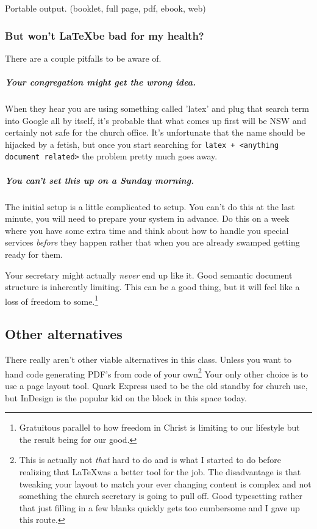 \documentclass[12pt]{scrartcl}
\begin{document}
Portable output. (booklet, full page, pdf, ebook, web)

\subsubsection{But won't \LaTeX be bad for my health?}

There are a couple pitfalls to be aware of.


\subparagraph{Your congregation might get the wrong idea.}

When they hear you are using something called 'latex' and plug that search term into Google all by itself, it's probable that what comes up first will be NSW and certainly not safe for the church office. It's unfortunate that the name should be hijacked by a fetish, but once you start searching for \texttt{latex + <anything document related>} the problem pretty much goes away.


\subparagraph{You can't set this up on a Sunday morning.}

The initial setup is a little complicated to setup. You can't do this at the last minute, you will need to prepare your system in advance. Do this on a week where you have some extra time and think about how to handle you special services \emph{before} they happen rather that when you are already swamped getting ready for them.

Your secretary might actually \emph{never} end up like it. Good semantic document structure is inherently limiting. This can be a good thing, but it will feel like a loss of freedom to some.\footnote{Gratuitous parallel to how freedom in Christ is limiting to our lifestyle but the result being for our good.}

\subsection{Other alternatives}

There really aren't other viable alternatives in this class. Unless you want to hand code generating PDF's from code of your own\footnote{This is actually not \emph{that} hard to do and is what I started to do before realizing that \LaTeX was a better tool for the job. The disadvantage is that tweaking your layout to match your ever changing content is complex and not something the church secretary is going to pull off. Good typesetting rather that just filling in a few blanks quickly gets too cumbersome and I gave up this route.} Your only other choice is to use a page layout tool. Quark Express used to be the old standby for church use, but InDesign is the popular kid on the block in this space today.
\end{document}
